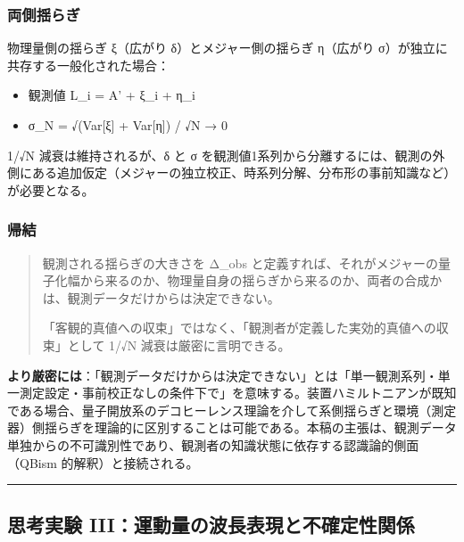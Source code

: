 \documentclass[
]{ltjsarticle}
\providecommand{\tightlist}{%
  \setlength{\itemsep}{0pt}\setlength{\parskip}{0pt}}
\begin{document}
\subsubsection{両側揺らぎ}\label{ux4e21ux5074ux63faux3089ux304e}

物理量側の揺らぎ ξ（広がり δ）とメジャー側の揺らぎ η（広がり
σ）が独立に共存する一般化された場合：

\begin{itemize}
\tightlist
\item
  観測値 L\_i = A' + ξ\_i + η\_i
\item
  σ\_N = √(Var{[}ξ{]} + Var{[}η{]}) / √N → 0
\end{itemize}

1/√N 減衰は維持されるが、δ と σ
を観測値1系列から分離するには、観測の外側にある追加仮定（メジャーの独立校正、時系列分解、分布形の事前知識など）が必要となる。

\subsubsection{帰結}\label{ux5e30ux7d50-1}

\begin{quote}
観測される揺らぎの大きさを Δ\_obs
と定義すれば、それがメジャーの量子化幅から来るのか、物理量自身の揺らぎから来るのか、両者の合成かは、観測データだけからは決定できない。

「客観的真値への収束」ではなく、「観測者が定義した実効的真値への収束」として
1/√N 減衰は厳密に言明できる。
\end{quote}

\textbf{より厳密には}：「観測データだけからは決定できない」とは「単一観測系列・単一測定設定・事前校正なしの条件下で」を意味する。装置ハミルトニアンが既知である場合、量子開放系のデコヒーレンス理論を介して系側揺らぎと環境（測定器）側揺らぎを理論的に区別することは可能である。本稿の主張は、観測データ単独からの不可識別性であり、観測者の知識状態に依存する認識論的側面（QBism
的解釈）と接続される。

\begin{center}\rule{0.5\linewidth}{0.5pt}\end{center}

\subsection{思考実験
III：運動量の波長表現と不確定性関係}\label{ux601dux8003ux5b9fux9a13-iiiux904bux52d5ux91cfux306eux6ce2ux9577ux8868ux73feux3068ux4e0dux78baux5b9aux6027ux95a2ux4fc2}
\end{document}
